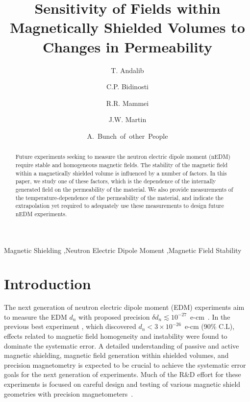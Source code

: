 \documentclass[review]{elsarticle}
\begin{document}
\begin{frontmatter}

\title{Sensitivity of Fields within Magnetically Shielded Volumes to
  Changes in Permeability}

\author[manitoba]{T. Andalib}
\author[winnipeg,manitoba]{C.P. Bidinosti}
\author[winnipeg,manitoba]{R.R. Mammei}
\author[winnipeg,manitoba]{J.W. Martin}
\author[winnipeg]{A.~Bunch~of~other~People}


\address[winnipeg]{Physics Department, The University of Winnipeg, 515 Portage Avenue, Winnipeg, MB, R3B 2E9, Canada}
\address[manitoba]{Department of Physics and Astronomy, University of Manitoba, Winnipeg, MB R3T 2N2, Canada}


\begin{abstract}
Future experiments seeking to measure the neutron electric dipole
moment (nEDM) require stable and homogeneous magnetic fields.  The
stability of the magnetic field within a magnetically shielded volume
is influenced by a number of factors.  In this paper, we study one of
these factors, which is the dependence of the internally generated
field on the permeability of the material.  We also provide
measurements of the temperature-dependence of the permeability of the
material, and indicate the extrapolation yet required to adequately
use these measurements to design future nEDM experiments.
\end{abstract}

\begin{keyword}
Magnetic Shielding \sep Neutron Electric Dipole Moment \sep Magnetic Field Stability
\end{keyword}

\end{frontmatter}

\linenumbers

\section{Introduction}

The next generation of neutron electric dipole moment (EDM)
experiments aim to measure the EDM $d_n$ with proposed precision
$\delta d_n\lesssim
10^{-27}$~e-cm~\cite{bib:nedm1,bib:nedm2,bib:nedm2.5,bib:nedm3,bib:nedm3.5,bib:nedm4,bib:nedm5,bib:nedm6,bib:nedm6.5}.
In the previous best experiment \cite{bib:pendlebury}, which discovered
$d_n<3\times 10^{-26}$~e-cm (90\% C.L), effects related to magnetic field
homogeneity and instability were found to dominate the systematic
error.  A detailed understanding of passive and active magnetic
shielding, magnetic field generation within shielded volumes, and
precision magnetometry is expected to be crucial to achieve the
systematic error goals for the next generation of experiments.  Much
of the R\&D effort for these experiments is focused on careful design
and testing of various magnetic shield geometries with precision
magnetometers~\cite{bib:brys,bib:afach,bib:fierlingerroom,bib:sturmthesis,bib:patton}.
\end{document}
